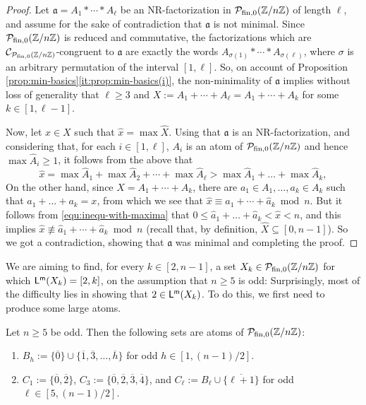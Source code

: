 \begin{proof}
Let $\mathfrak{a} = A_1 \ast \cdots \ast A_\ell$ be an NR-factorization in $\mathcal P_{\textrm{fin},0}(\mathbb{Z}/n\mathbb{Z})$ of length $\ell$, and assume for the sake of contradiction that $\mathfrak a$ is not minimal. Since
$\mathcal{P}_{\textrm{fin},0}(\mathbb{Z}/n\mathbb{Z})$ is reduced and commutative, the factorizations which are $\mathcal{C}_{\mathcal{P}_{\textrm{fin},0}(\mathbb{Z}/n\mathbb{Z})}$-congruent to $\mathfrak{a}$ are exactly the words $A_{\sigma(1)} \ast \cdots \ast A_{\sigma(\ell)}$, where $\sigma$ is an arbitrary permutation of the interval $[ 1, \ell ]$.
So, on account of Proposition \ref{prop:min-basics}\ref{it:prop:min-basics(i)}, the non-minimality of $\mathfrak{a}$ implies without loss of generality that $\ell \ge 3$ and $
X := A_1 + \cdots + A_\ell = A_1 + \cdots + A_k$ for some $k \in [ 1, \ell-1 ]$. 

Now, let $x \in X$ such that $\hat{x} = \max \hat{X}$. Using that $\mathfrak a$ is an NR-factorization, and considering that, for each $i \in [ 1, \ell ]$, $A_i$ is an atom of $\mathcal P_{\textrm{fin},0}(\mathbb{Z}/n\mathbb{Z})$ and hence $\max \hat{A}_i \ge 1$, it follows from the above that
\begin{equation}\label{equ:inequ-with-maxima}
\hat{x} = \max\hat{A}_1+\max\hat{A}_2+\cdots+\max\hat{A}_\ell > \max\hat{A}_1 + \dots + \max\hat{A}_k,
\end{equation}
On the other hand, since $X = A_1 + \cdots + A_k$, there are $a_1 \in A_1,\dots, a_k \in A_k$ such that $a_1+\dots+ a_k = x$, from which we see that $\hat{x} \equiv \hat{a}_1 + \cdots + \hat{a}_k \bmod n$. But it follows from \eqref{equ:inequ-with-maxima} that
$
0 \le \hat{a}_1+\dots+ \hat{a}_k < \hat{x} < n$, and this implies $\hat{x} \not\equiv \hat{a}_1 + \cdots + \hat{a}_k \bmod n$ (recall that, by definition, $\hat{X} \subseteq [ 0, n-1 ]$). So we got a contradiction, showing that $\mathfrak a$ was minimal and completing the proof.
\end{proof}


We are aiming to find, for every $k\in[ 2, n-1]$, a set $X_k\in\mathcal{P}_{\textrm{fin},0}(\mathbb{Z}/n\mathbb{Z})$ for which $\mathsf{L}^{\mathsf{m}}(X_k) = [ 2, k ]$, on the assumption that $n\ge 5$ is odd:
Surprisingly, most of the difficulty lies in showing that $2\in \mathsf{L}^{\mathsf{m}}(X_k)$.
To do this, we first need to produce some large atoms.

\begin{prop}\label{large-atom-construction}
Let $n\ge 5$ be odd.
Then the following sets are atoms of $\mathcal P_{\textrm{fin},0}(\mathbb{Z}/n\mathbb{Z})$:
\begin{enumerate}[label={\rm (\roman{*})}]
\item\label{it:large-atom-construction(i)} $B_h := \bigl\{\overline{0}\} \cup \{\overline{1},\overline{3},\dots, \overline{h}\bigr\}$ for odd $h\in [ 1,(n-1)/2 ]$.
\item\label{it:large-atom-construction(ii)} $C_1 := \bigl\{\overline{0}, \overline{2}\bigr\}$, $C_3 := \bigl\{\overline{0},\overline{2},\overline{3},\overline{4}\bigr\}$, and $C_\ell := B_\ell\cup\bigl\{\overline{\ell+1}\bigr\}$ for odd $\ell\in [ 5, (n-1)/2 ]$.
\end{enumerate}
\end{prop}


